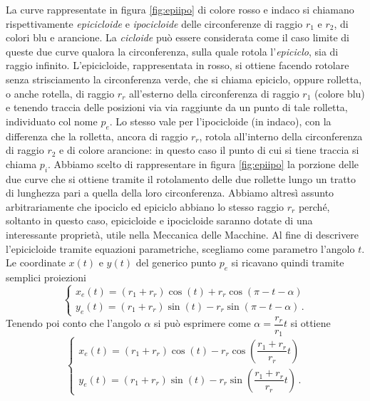 \noindent La curve rappresentate in figura \ref{fig:epiipo} 
di colore rosso e indaco si chiamano
rispettivamente {\em epicicloide}
e {\em ipocicloide} delle circonferenze di raggio $r_1$
e $r_2$, di colori blu e arancione.
La {\em cicloide}
pu\`o essere considerata come il caso limite di queste due curve qualora la
circonferenza, sulla quale rotola l'{\em epiciclo},
sia di raggio infinito.
L'epicicloide, rappresentata in rosso,
si ottiene facendo rotolare senza strisciamento la circonferenza verde, che
si chiama epiciclo, oppure rolletta, o anche rotella,
di raggio $r_r$ all'esterno della circonferenza di
raggio $r_1$ (colore blu) e tenendo traccia delle posizioni via via raggiunte
da un punto di tale rolletta, individuato col nome $p_e$.
Lo stesso vale per l'ipocicloide (in indaco), con la differenza che la
rolletta, ancora
di raggio $r_r$, rotola all'interno della circonferenza di raggio $r_2$
e di colore arancione: in questo caso
il punto di cui si tiene traccia si chiama $p_i$.
Abbiamo scelto di rappresentare in figura \ref{fig:epiipo} la porzione delle
due curve che si ottiene tramite  il rotolamento delle due rollette lungo
un tratto di lunghezza pari a quella della loro circonferenza.
Abbiamo altres\`i assunto arbitrariamente che ipociclo ed epiciclo abbiano
lo stesso raggio $r_r$ perch\'e, soltanto in questo caso, epicicloide e
ipocicloide saranno dotate di una interessante propriet\`a, utile nella
Meccanica delle Macchine.
\noindent Al fine di descrivere l'epicicloide tramite equazioni
parametriche, scegliamo come parametro l'angolo $t$. Le coordinate $x(t)$ e
$y(t)$ del generico punto $p_e$ si ricavano quindi tramite semplici proiezioni
\begin{equation}
\begin{cases}
{x_e}\left(t\right)=\left(r_1+r_r\right)\cos\left(t\right) +
r_r\cos\left(\pi - t - \alpha\right) \\
{y_e}\left(t\right)=\left(r_1+r_r\right)\sin\left(t\right)-
r_r\sin\left(\pi -t -\alpha\right) \,.
\end{cases}
\end{equation}
\noindent Tenendo poi conto che l'angolo $\alpha$ si pu\`o esprimere
come $\alpha = \dfrac{r_r}{r_1}t$ si ottiene
\begin{equation}
\begin{cases}
{x_e}\left(t\right)=\left(r_1+r_r\right)\cos\left(t\right) -
r_r\cos\left(\dfrac{r_1+r_r}{r_r}t\right) \\
{y_e}\left(t\right)=\left(r_1+r_r\right)\sin\left(t\right)-
r_r\sin\left(\dfrac{r_1+r_r}{r_r}t\right)\,.
\end{cases}
\label{eq:epicicloide}
\end{equation}
